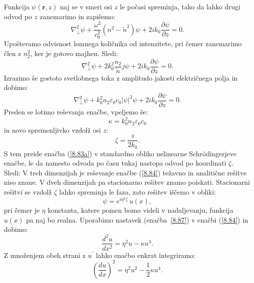 Funkcija $\psi(\mathbf{r},z)$ naj se v smeri osi $z$ le počasi spreminja, tako da lahko
drugi odvod po $z$ zanemarimo in zapišemo: 
\begin{equation}
\nabla_{\bot}^{2}\psi+\frac{\omega^{2}}{c_0^{2}}(n^{2}-\tilde{n}^{2})\psi+2ik_{0}
\frac{\partial\psi}{\partial z}=0.
\label{8.82}
\end{equation}
Upoštevamo odvisnost lomnega količnika od intenzitete, pri čemer
zanemarimo člen z $n_{2}^{2}$, ker je gotovo majhen. Sledi:
\begin{equation}
\nabla_{\bot}^{2}\psi+2k_{0}^{2}\frac{n_{2}}{\tilde{n}}j\psi+2ik_{0}\frac{\partial\psi}{\partial z}=0.
\label{8.83}
\end{equation}
Izrazimo še gostoto svetlobnega toka z amplitudo jakosti električnega polja in dobimo:
\begin{equation}
\nabla_{\bot}^{2}\psi+
k_{0}^{2} n_2 \varepsilon_0 c_0 |\psi|^2 \psi+
2ik_{0}\frac{\partial\psi}{\partial z}=0.
\label{8.83a}
\end{equation}
Preden se lotimo reševanja enačbe, vpeljemo še:
\begin{equation}
\kappa=k_{0}^{2} n_2 \varepsilon_0 c_0
\end{equation}
 in novo spremenljivko vzdolž osi $z$:
\begin{equation}
\zeta=\frac{z}{2k_{0}}.
\end{equation}
 S tem preide enačba (\ref{8.83a}) v standardno obliko nelinearne Schr\"odingerjeve
enačbe, le da namesto odvoda po času tukaj nastopa odvod po koordinati $\zeta$. Sledi:
V treh dimenzijah je reševanje enačbe (\ref{8.84}) težavno in analitične
rešitve niso znane. V dveh dimenzijah pa stacionarno rešitev znamo
poiskati. Stacionarni rešitvi se vzdolž $\zeta$ lahko spreminja le faza, zato
rešitev iščemo v obliki:
\begin{equation}
\psi=e^{i\eta^{2}\zeta}\, u(x),
\label{8.87}
\end{equation}
pri čemer je $\eta$ konstanta, katere pomen bomo videli v nadaljevanju, 
 funkcija $u(x)$ pa naj bo realna. 
Uporabimo nastavek (enačba~\ref{8.87}) v enačbi (\ref{8.84}) in dobimo:
\begin{equation}
\frac{d^{2}u}{dx^{2}}=\eta^{2}u-\kappa u^{3}.
\end{equation}
 Z množenjem obeh strani z $u^{\prime}$ lahko enačbo enkrat integriramo:
\begin{equation}
\left(\frac{du}{dx}\right)^{2}=\eta^{2}u^{2}-\frac{1}{2}\kappa u^{4}.
\end{equation}
